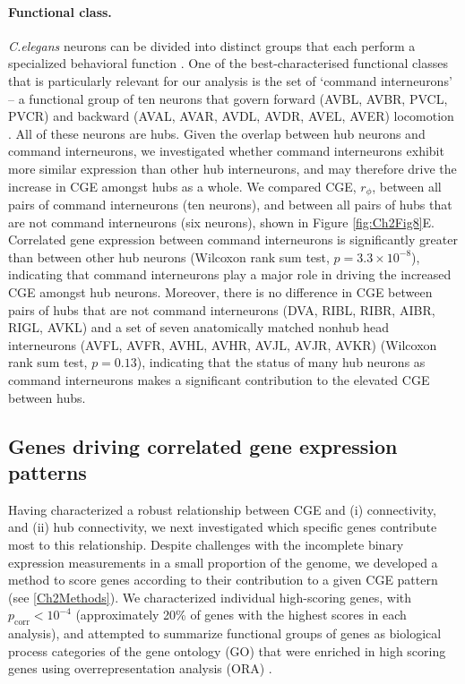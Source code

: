 {\paragraph{Functional class.}
\emph{C.elegans} neurons can be divided into distinct groups that each perform a specialized behavioral function \citep{Hobert2003}.
One of the best-characterised functional classes that is particularly relevant for our analysis is the set of `command interneurons' -- a functional group of ten neurons that govern forward (AVBL, AVBR, PVCL, PVCR) and backward (AVAL, AVAR, AVDL, AVDR, AVEL, AVER) locomotion \citep{Rakowski2013}.
All of these neurons are hubs.
Given the overlap between hub neurons and command interneurons, we investigated whether command interneurons exhibit more similar expression than other hub interneurons, and may therefore drive the increase in CGE amongst hubs as a whole.
We compared CGE, $r_\phi$, between all pairs of command interneurons (ten neurons), and between all pairs of hubs that are not command interneurons (six neurons), shown in Figure \ref{fig:Ch2Fig8}E.
Correlated gene expression between command interneurons is significantly greater than between other hub neurons (Wilcoxon rank sum test, $p = 3.3 \times 10^{-8}$), indicating that command interneurons play a major role in driving the increased CGE amongst hub neurons.
Moreover, there is no difference in CGE between pairs of hubs that are not command interneurons (DVA, RIBL, RIBR, AIBR, RIGL, AVKL) and a set of seven anatomically matched nonhub head interneurons (AVFL, AVFR, AVHL, AVHR, AVJL, AVJR, AVKR) (Wilcoxon rank sum test, $p = 0.13$), indicating that the status of many hub neurons as command interneurons makes a significant contribution to the elevated CGE between hubs.

\subsection{Genes driving correlated gene expression patterns}

Having characterized a robust relationship between CGE and (i) connectivity, and (ii) hub connectivity, we next investigated which specific genes contribute most to this relationship.
Despite challenges with the incomplete binary expression measurements in a small proportion of the genome, we developed a method to score genes according to their contribution to a given CGE pattern (see \ref{Ch2Methods}).
We characterized individual high-scoring genes, with $p_\mathrm{corr} < 10^{-4}$ (approximately 20\% of genes with the highest scores in each analysis), and attempted to summarize functional groups of genes as biological process categories of the gene ontology (GO) that were enriched in high scoring genes using overrepresentation analysis (ORA) \citep{Ashburner2000, Gillis2010}.

}

